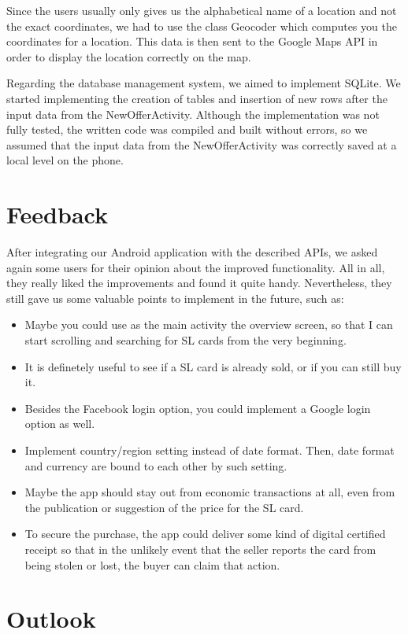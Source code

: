 \documentclass[11pt,twoside,a4paper]{report}
\begin{document}
Since the users usually only gives us the alphabetical name of a location and not the exact coordinates, we had to use the class Geocoder which computes you the coordinates for a location. This data is then sent to the Google Maps API in order to display the location correctly on the map.

Regarding the database management system, we aimed to implement SQLite. We started implementing the creation of tables and insertion of new rows after the input data from the NewOfferActivity. Although the implementation was not fully tested, the written code was compiled and built without errors, so we assumed that the input data from the NewOfferActivity was correctly saved at a local level on the phone.

\section{Feedback}

After integrating our Android application with the described APIs, we asked again some users for their opinion about the improved functionality. All in all, they really liked the improvements and found it quite handy. Nevertheless, they still gave us some valuable points to implement in the future, such as:

\begin{itemize}
\item Maybe you could use as the main activity the overview screen, so that I can start scrolling and searching for SL cards from the very beginning.
\item It is definetely useful to see if a SL card is already sold, or if you can still buy it.
\item Besides the Facebook login option, you could implement a Google login option as well.
\item Implement country/region setting instead of date format. Then, date format and currency are bound to each other by such setting.
\item Maybe the app should stay out from economic transactions at all, even from the publication or suggestion of the price for the SL card.
\item To secure the purchase, the app could deliver some kind of digital certified receipt so that in the unlikely event that the seller reports the card from being stolen or lost, the buyer can claim that action.
\end{itemize}

\section{Outlook}
\end{document}
